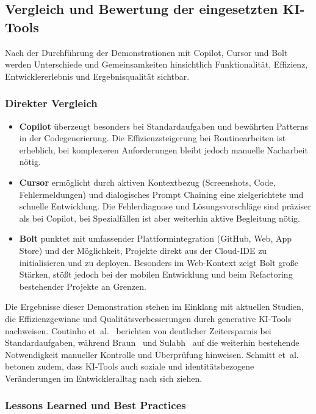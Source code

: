\subsection{Vergleich und Bewertung der eingesetzten KI-Tools}

Nach der Durchführung der Demonstrationen mit Copilot, Cursor und Bolt werden
Unterschiede und Gemeinsamkeiten hinsichtlich Funktionalität, Effizienz,
Entwicklererlebnis und Ergebnisqualität sichtbar.

\subsubsection{Direkter Vergleich}

\begin{itemize}
      \item \textbf{Copilot} überzeugt besonders bei Standardaufgaben und bewährten Patterns in der Codegenerierung. Die Effizienzsteigerung bei Routinearbeiten ist erheblich, bei komplexeren Anforderungen bleibt jedoch manuelle Nacharbeit nötig.
      \item \textbf{Cursor} ermöglicht durch aktiven Kontextbezug (Screenshots, Code, Fehlermeldungen) und dialogisches Prompt Chaining eine zielgerichtete und schnelle Entwicklung. Die Fehlerdiagnose und Lösungsvorschläge sind präziser als bei Copilot, bei Spezialfällen ist aber weiterhin aktive Begleitung nötig.
      \item \textbf{Bolt} punktet mit umfassender Plattformintegration (GitHub, Web, App Store) und der Möglichkeit, Projekte direkt aus der Cloud-IDE zu initialisieren und zu deployen. Besonders im Web-Kontext zeigt Bolt große Stärken, stößt jedoch bei der mobilen Entwicklung und beim Refactoring bestehender Projekte an Grenzen.
\end{itemize}

Die Ergebnisse dieser Demonstration stehen im Einklang mit aktuellen Studien,
die Effizienzgewinne und Qualitätsverbesserungen durch generative KI-Tools
nachweisen. Coutinho et~al.~\cite{coutinho_role_2024} berichten von deutlicher
Zeitersparnis bei Standardaufgaben, während Braun~\cite{braun_ki_2024} und
Sulabh~\cite{s_future_2024} auf die weiterhin bestehende Notwendigkeit
manueller Kontrolle und Überprüfung hinweisen. Schmitt
et~al.~\cite{schmitt_generative_2024} betonen zudem, dass KI-Tools auch soziale
und identitätsbezogene Veränderungen im Entwickleralltag nach sich ziehen.

\subsubsection{Lessons Learned und Best Practices}

